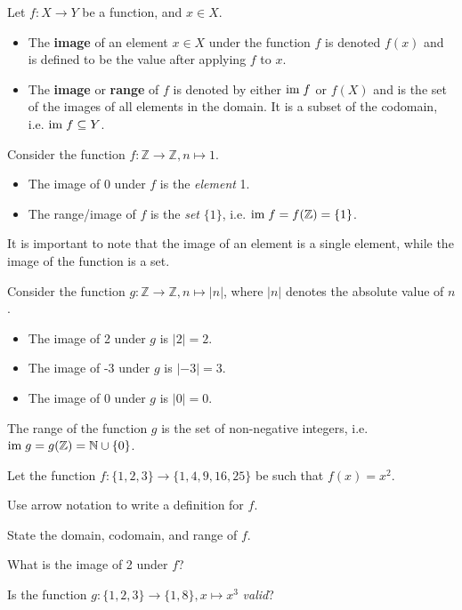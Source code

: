 \begin{definition}
    Let $f: X \to Y$ be a function, and $x \in X$.
    \begin{itemize}
        \item The \textbf{image} of an element $x \in X$ under the function $f$ is denoted $f(x)$ and is defined to be the value after applying $f$ to $x$.
        \item The \textbf{image} or \textbf{range} of $f$ is denoted by either $\mathrm{im}\; f$ or $f(X)$ and is the set of the images of all elements in the domain. It is a subset of the codomain, i.e. $\mathrm{im}\; f \subseteq Y$.
    \end{itemize}
\end{definition}
\begin{example}
    Consider the function $f: \mathbb{Z} \to \mathbb{Z}, n \mapsto 1$.
    \begin{itemize}
        \item The image of 0 under $f$ is the \textit{element} 1.
        \item The range/image of $f$ is the \textit{set} $\{1\}$, i.e. $\mathrm{im}\; f = f(\mathbb{Z}) = \{1\}$.
    \end{itemize}
    It is important to note that the image of an element is a single element, while the image of the function is a set.
\end{example}
\begin{example}
    Consider the function $g: \mathbb{Z} \to \mathbb{Z}, n \mapsto |n|$, where $|n|$ denotes the absolute value of $n$.
    \begin{itemize}
        \item The image of 2 under $g$ is $|2| = 2$.
        \item The image of -3 under $g$ is $|-3| = 3$.
        \item The image of 0 under $g$ is $|0| = 0$.
    \end{itemize}
    The range of the function $g$ is the set of non-negative integers, i.e. $\mathrm{im}\; g = g(\mathbb{Z}) = \mathbb{N} \cup \{0\}$.
\end{example}

\begin{exercise}
    Let the function $f: \{1, 2, 3\} \to \{1, 4, 9, 16, 25\}$ be such that $f(x) = x^2$.
    \begin{partquestions}{\roman*}
        \item Use arrow notation to write a definition for $f$.
        \item State the domain, codomain, and range of $f$.
        \item What is the image of 2 under $f$?
        \item Is the function $g: \{1, 2, 3\} \to \{1, 8\}, x \mapsto x^3$ \textit{valid}?
    \end{partquestions}
\end{exercise}

